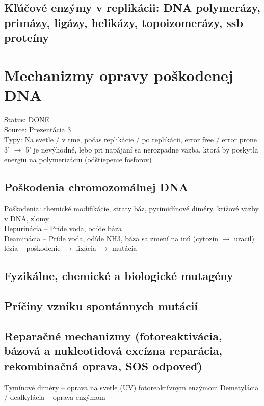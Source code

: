 \subsection*{Kľúčové enzýmy v replikácii: DNA polymerázy, primázy, ligázy, helikázy, topoizomerázy, ssb proteíny}

\section{Mechanizmy opravy poškodenej DNA}

Status: DONE\\
Source: Prezentácia 3\\

Typy: Na svetle / v tme, počas replikácie / po replikácii, error free / error prone\\
3' $\rightarrow$ 5' je nevýhodné, lebo pri napájaní sa nerozpadne väzba, ktorá by poskytla energiu na polymerizáciu (odštiepenie fosforov)\\

\subsection*{Poškodenia chromozomálnej DNA}
Poškodenia: chemické modifikácie, straty báz, pyrimidínové diméry, krížové väzby v DNA, zlomy\\
Depurinácia -- Príde voda, odíde báza\\
Deaminácia -- Príde voda, odíde NH3, báza sa zmení na inú (cytozín $\rightarrow$ uracil)\\
lézia -- poškodenie $\rightarrow$ fixácia $\rightarrow$ mutácia\\
\subsection*{Fyzikálne, chemické a biologické mutagény}

\subsection*{Príčiny vzniku spontánnych mutácií}

\subsection*{Reparačné mechanizmy (fotoreaktivácia, bázová a nukleotidová excízna reparácia, rekombinačná oprava, SOS odpoveď)}

Tymínové diméry -- oprava na svetle (UV) fotoreaktívnym enzýmom
Demetylácia / dealkylácia -- oprava enzýmom

